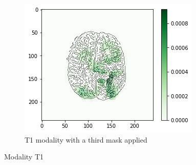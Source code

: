 \begin{figure}[H]
    \begin{subfigure}[t]{.45\textwidth}
        \centering
        \includegraphics[width=\linewidth]{chapters/06_hdm/b_Brats18_TCIA08_242_1_L2/24.png}
        \caption{T1 modality with a third mask applied}
    \end{subfigure}
    \caption{Modality T1}
\end{figure}


